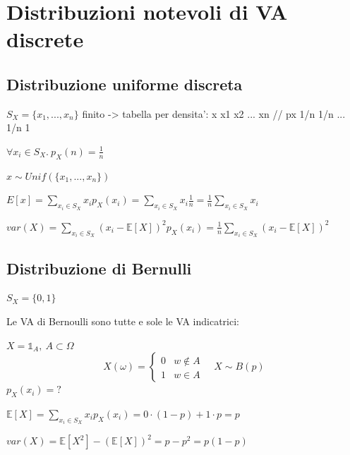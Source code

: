 \section{Distribuzioni notevoli di VA discrete}

\subsection{Distribuzione uniforme discreta}

$ S_X = \{x_1,...,x_n\} $ finito -> tabella per densita':
 x x1 x2 ... xn //
 px 1/n 1/n ... 1/n 1

$ \forall x_i \in S_X.\ p_X(n) = \frac{1}{n} $

$ x \sim Unif(\{x_1,...,x_n\}) $

$ E[x] = \sum_{x_i \in S_X} x_i p_X(x_i) = \sum_{x_i \in S_X} x_i \frac{1}{n} = \frac{1}{n} \sum_{x_i \in S_X} x_i $

$ var(X) = \sum_{x_i \in S_X} (x_i - \mathbb{E}[X])^2p_X(x_i) = \frac{1}{n}\sum_{x_i \in S_X} (x_i - \mathbb{E}[X])^2 $

\subsection{Distribuzione di Bernulli}
$ S_X = \{0,1\} $

Le VA di Bernoulli sono tutte e sole le VA indicatrici:

$ X = \mathbb{1}_A,\ A \subset \Omega $
\[
  X(\omega) = \begin{cases}
  0 & w \notin A\\
  1 & w \in A
  \end{cases}\quad X \sim B(p)
\]
$ p_X(x_i) = ? $

$ \mathbb{E}[X] = \sum_{x_i \in S_X} x_i p_X(x_i) = 0 \cdot (1-p) + 1 \cdot p = p $

$ var(X) = \mathbb{E}[X^2] - (\mathbb{E}[X])^2 = p - p^2  = p(1-p) $


